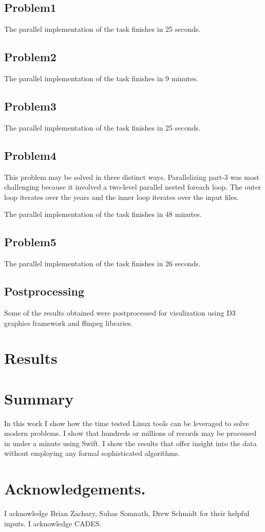 \documentclass{report}
\begin{document}
\subsection*{Problem1}
The parallel implementation of the task finishes in 25 seconds.
\subsection*{Problem2}
The parallel implementation of the task finishes in 9 minutes.
\subsection*{Problem3}
The parallel implementation of the task finishes in 25 seconds.
\subsection*{Problem4}
This problem may be solved in three distinct ways. Parallelizing part-3 was
most challenging because it involved a two-level parallel nested foreach loop.
The outer loop iterates over the years and the inner loop iterates over the
input files.

The parallel implementation of the task finishes in 48 minutes.
\subsection*{Problem5}
The parallel implementation of the task finishes in 26 seconds.

\subsection*{Postprocessing}
Some of the results obtained were postprocessed for visulization using D3
graphics framework and ffmpeg libraries.

\section*{Results}

\section*{Summary}
In this work I show how the time tested Linux tools can be leveraged to solve
modern problems. I show that hundreds or millions of records may be processed
in under a minute using Swift. I show the results that offer insight into the
data without employing any formal sophisticated algorithms.

\section*{Acknowledgements.}
I acknowledge Brian Zachary, Suhas Somnath, Drew Schmidt for their helpful
inputs. I acknowledge CADES.
\end{document}
